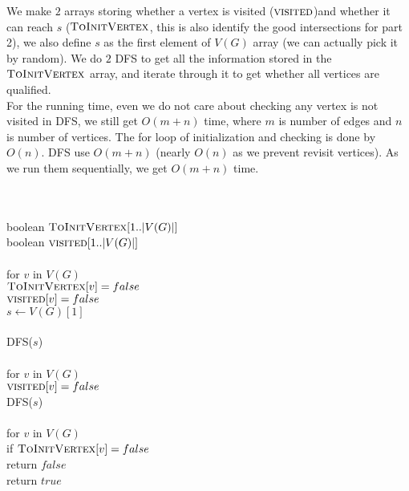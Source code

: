 \documentclass[11pt]{article}
\begin{document}
\begin{itemize}
	 	We make $2$ arrays storing whether a vertex is visited ($\textsc{visited}$)and whether it can reach $s$ ($\textsc{ToInitVertex}$, this is also identify the good intersections for part 2), we also define $s$ as the first element of $V(G)$ array (we can actually pick it by random). We do $2$ DFS to get all the information stored in the $\textsc{ToInitVertex}$ array, and iterate through it to get whether all vertices are qualified.\\
	 	For the running time, even we do not care about checking any vertex is not visited in DFS, we still get $O(m + n)$ time, where $m$ is number of edges and $n$ is number of vertices. The for loop of initialization and checking is done by $O(n)$. DFS use $O(m + n)$ (nearly $O(n)$ as we prevent revisit vertices). As we run them sequentially, we get $O(m + n)$ time.
	 	
\begin{algo}
	\+
\\[0.5ex]
\\		boolean $\textsc{ToInitVertex}[1..|V(G)|]$
\\		boolean $\textsc{visited}[1..|V(G)|]$
\\
\\		for $v$ in $V(G)$\+
\\			$\textsc{ToInitVertex}[v] = false$
\\			$\textsc{visited}[v] = false$\-
\\		$s \gets V(G)[1]$
\\
\\		DFS($s$)
\\
\\		for $v$ in $V(G)$\+
\\			$\textsc{visited}[v] = false$\-
\\		DFS($s$)
\\						
\\		for $v$ in $V(G)$\+
\\			if $\textsc{ToInitVertex}[v] = false$\+
\\				return $false$\- \-
\\		return $true$
\\
\\[0.5ex]
\end{algo}


\end{itemize}
\end{document}
